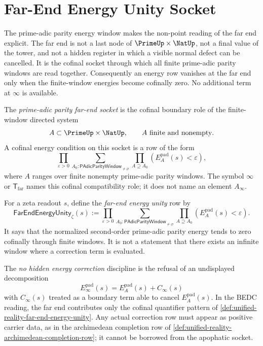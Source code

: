 \section{Far-End Energy Unity Socket}
\label{sec:unified-reality-far-end-energy-unity-socket}

The prime-adic parity energy window makes the non-point reading of the
far end explicit.  The far end is not a last node of
$\PrimeUp\times\NatUp$, not a final value of the tower, and not a hidden
register in which a visible normal defect can be cancelled.  It is the
cofinal socket through which all finite prime-adic parity windows are
read together.  Consequently an energy row vanishes at the far end only
when the finite-window energies become cofinally zero.  No additional
term at $\infty$ is available.

\begin{definition}
\label{def:unified-reality-prime-adic-parity-far-end-socket}
The \emph{prime-adic parity far-end socket} is the cofinal boundary role
of the finite-window directed system
$$
A\subset\PrimeUp\times\NatUp,
\qquad
A\text{ finite and nonempty}.
$$
A cofinal energy condition on this socket is a row of the form
$$
\prod_{\varepsilon>0}
\sum_{A_0:\mathsf{PAdicParityWindow}_{\ne\varnothing}}
\prod_{A\supseteq A_0}
\left(
E_A^{\mathrm{pad}}(s)<\varepsilon
\right),
$$
where $A$ ranges over finite nonempty prime-adic parity windows.  The
symbol $\infty$ or $\mathsf{T}_{\mathrm{far}}$ names this cofinal
compatibility role; it does not name an element $A_\infty$.
\end{definition}

\begin{definition}
\label{def:unified-reality-far-end-energy-unity}
For a zeta readout $s$, define the \emph{far-end energy unity} row by
$$
\mathsf{FarEndEnergyUnity}_{\zeta}(s)
:=
\prod_{\varepsilon>0}
\sum_{A_0:\mathsf{PAdicParityWindow}_{\ne\varnothing}}
\prod_{A\supseteq A_0}
\left(
E_A^{\mathrm{pad}}(s)<\varepsilon
\right).
$$
It says that the normalized second-order prime-adic parity energy tends
to zero cofinally through finite windows.  It is not a statement that
there exists an infinite window where a correction term is evaluated.
\end{definition}

\begin{definition}
\label{def:unified-reality-no-hidden-energy-correction-far-end}
The \emph{no hidden energy correction} discipline is the refusal of an
undisplayed decomposition
$$
E_{\infty}^{\mathrm{pad}}(s)
=
E_A^{\mathrm{pad}}(s)+C_{\infty}(s)
$$
with $C_{\infty}(s)$ treated as a boundary term able to cancel
$E_A^{\mathrm{pad}}(s)$.  In the BEDC reading, the far end contributes
only the cofinal quantifier pattern of
\autoref{def:unified-reality-far-end-energy-unity}.  Any actual
correction row must appear as positive carrier data, as in the
archimedean completion row of
\autoref{def:unified-reality-archimedean-completion-row}; it cannot be
borrowed from the apophatic socket.
\end{definition}

